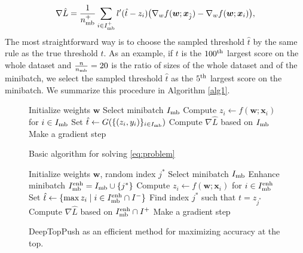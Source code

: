 \begin{equation}\label{eq:grad2}
  \nabla \hat L = \frac{1}{n_{\rm mb}^+}\sum_{i\in I_{\rm mb}^+}l'(\hat t-z_i)\big(\nabla_w f(\bm{w};\bm{x}_{\hat j}) - \nabla_w f(\bm{w};\bm{x}_i) \big),
\end{equation}
The most straightforward way is to choose the sampled threshold $\hat t$ by the same rule as the true threshold $t$. As an example, if $t$ is the $100^{\rm th}$ largest score on the whole dataset and $\frac{n}{n_{\rm mb}}=20$ is the ratio of sizes of the whole dataset and of the minibatch, we select the sampled threshold $\hat t$ as the $5^{\rm th}$ largest score on the minibatch. We summarize this procedure in Algorithm \ref{alg1}.

\begin{figure}
  \begin{minipage}{0.48\textwidth}
    \begin{algorithm}[H]
      \centering
      \begin{algorithmic}[1]
        \State Initialize weights $\bm{w}$
        \Repeat
        \State Select minibatch $I_{\rm mb}$
        \State \phantom{$\Iminh$}
        \State Compute $z_i\gets f(\bm{w};\bm{x}_i)$ for $i\in I_{\rm mb}$
        \State Set $\hat t \gets G(\{(z_i,y_i)\}_{i\in I_{\rm mb}})$
        \State 
        \State Compute $\nabla \hat L$ based on $I_{\rm mb}$\phantom{$\Iminh$}
        \State Make a gradient step
      \end{algorithmic}
      \caption{Basic algorithm for solving \eqref{eq:problem} \\}
      \label{alg1}
    \end{algorithm}
  \end{minipage}
  \hfill
  \begin{minipage}{0.48\textwidth}
    \begin{algorithm}[H]
      \centering
      \begin{algorithmic}[1]
        \State Initialize weights $\bm{w}$, random index $j^*$
        \Repeat
        \State Select minibatch $I_{\rm mb}$
        \State Enhance minibatch $I_{\rm mb}^{\rm enh} = I_{\rm mb} \cup \{j^*\}$
        \State Compute $z_i\gets f(\bm{w};\bm{x}_i)$ for $i\in I_{\rm mb}^{\rm enh}$
        \State Set $\hat t \gets \{\max z_i \mid i\in I_{\rm mb}^{\rm enh} \cap I^-\}$
        \State Find index $j^*$ such that $t = z_{j^*}$
        \State Compute $\nabla \hat L$ based on $I_{\rm mb}^{\rm enh}\cap I^+$
        \State Make a gradient step
      \end{algorithmic}
      \caption{DeepTopPush as an efficient method for maximizing accuracy at the top.}
      \label{alg2}
    \end{algorithm}
  \end{minipage}
\end{figure}

